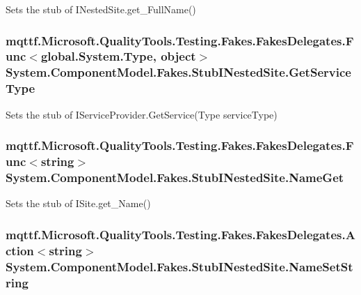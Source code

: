Sets the stub of I\-Nested\-Site.\-get\-\_\-\-Full\-Name()

\hypertarget{class_system_1_1_component_model_1_1_fakes_1_1_stub_i_nested_site_a77be89f8d7b997025313d80e0fcea990}{
\subsubsection[{Get\-Service\-Type}]{\setlength{\rightskip}{0pt plus 5cm}mqttf.\-Microsoft.\-Quality\-Tools.\-Testing.\-Fakes.\-Fakes\-Delegates.\-Func$<$global.\-System.\-Type, object$>$ System.\-Component\-Model.\-Fakes.\-Stub\-I\-Nested\-Site.\-Get\-Service\-Type}}\label{class_system_1_1_component_model_1_1_fakes_1_1_stub_i_nested_site_a77be89f8d7b997025313d80e0fcea990}


Sets the stub of I\-Service\-Provider.\-Get\-Service(\-Type service\-Type)

\hypertarget{class_system_1_1_component_model_1_1_fakes_1_1_stub_i_nested_site_a319fbd140f1c4fa562f60702539df02d}{
\subsubsection[{Name\-Get}]{\setlength{\rightskip}{0pt plus 5cm}mqttf.\-Microsoft.\-Quality\-Tools.\-Testing.\-Fakes.\-Fakes\-Delegates.\-Func$<$string$>$ System.\-Component\-Model.\-Fakes.\-Stub\-I\-Nested\-Site.\-Name\-Get}}\label{class_system_1_1_component_model_1_1_fakes_1_1_stub_i_nested_site_a319fbd140f1c4fa562f60702539df02d}


Sets the stub of I\-Site.\-get\-\_\-\-Name()

\hypertarget{class_system_1_1_component_model_1_1_fakes_1_1_stub_i_nested_site_af421bebab6e292fcb5459d78bf925c38}{
\subsubsection[{Name\-Set\-String}]{\setlength{\rightskip}{0pt plus 5cm}mqttf.\-Microsoft.\-Quality\-Tools.\-Testing.\-Fakes.\-Fakes\-Delegates.\-Action$<$string$>$ System.\-Component\-Model.\-Fakes.\-Stub\-I\-Nested\-Site.\-Name\-Set\-String}}\label{class_system_1_1_component_model_1_1_fakes_1_1_stub_i_nested_site_af421bebab6e292fcb5459d78bf925c38}


